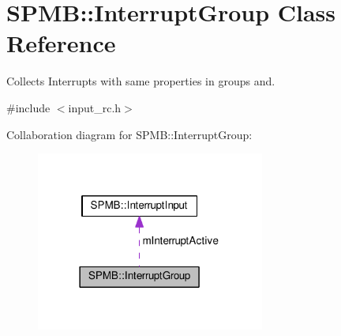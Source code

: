 \hypertarget{classSPMB_1_1InterruptGroup}{}\section{S\+P\+MB\+:\+:Interrupt\+Group Class Reference}
\label{classSPMB_1_1InterruptGroup}


Collects Interrupts with same properties in groups and.  




{\ttfamily \#include $<$input\+\_\+rc.\+h$>$}



Collaboration diagram for S\+P\+MB\+:\+:Interrupt\+Group\+:\nopagebreak
\begin{figure}[H]
\begin{center}
\leavevmode
\includegraphics[width=213pt]{classSPMB_1_1InterruptGroup__coll__graph}
\end{center}
\end{figure}
